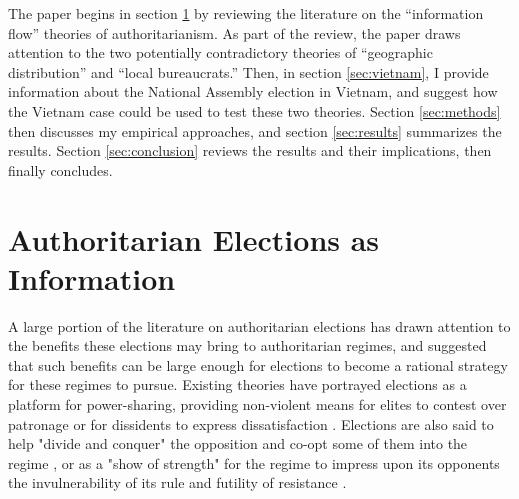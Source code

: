 \documentclass[12pt]{article}\usepackage[]{graphicx}\usepackage[]{color}
\newcommand{\1}{\mathbbm{1}}
\begin{document}
The paper begins in section \ref{sec:info} by reviewing the literature on the ``information flow'' theories of authoritarianism. As part of the review, the paper draws attention to the two potentially contradictory theories of ``geographic distribution'' and ``local bureaucrats.'' Then, in section \ref{sec:vietnam}, I provide information about the National Assembly election in Vietnam, and suggest how the Vietnam case could be used to test these two theories. Section \ref{sec:methods} then discusses my empirical approaches, and section \ref{sec:results} summarizes the results. Section \ref{sec:conclusion} reviews the results and their implications, then finally concludes.


\section{Authoritarian Elections as Information}
\label{sec:info}
A large portion of the literature on authoritarian elections has drawn attention to the benefits these elections may bring to authoritarian regimes, and suggested that such benefits can be large enough for elections to become a rational strategy for these regimes to pursue. Existing theories have portrayed elections as a platform for power-sharing, providing non-violent means for elites to contest over patronage \citep{LustOkar2006} or for dissidents to express dissatisfaction \citep{AR2005}. Elections are also said to help "divide and conquer" the opposition and co-opt some of them into the regime \citep{LustOkar2005}, or as a "show of strength" for the regime to impress upon its opponents the invulnerability of its rule and futility of resistance \citep{Geddes2005}. 
\end{document}
